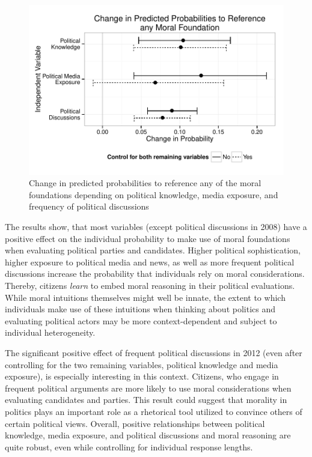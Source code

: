 \documentclass[12pt]{article}
\begin{document}
\begin{figure}\centering
\includegraphics{../calc/fig/fig3learn.pdf}
\caption{Change in predicted probabilities to reference any of the moral foundations depending on political knowledge, media exposure, and frequency of political discussions}\label{fig:3learn}
\end{figure}

The results show, that most variables (except political discussions in 2008) have a positive effect on the individual probability to make use of moral foundations when evaluating political parties and candidates. Higher political sophistication, higher exposure to political media and news, as well as more frequent political discussions increase the probability that individuals rely on moral considerations. Thereby, citizens \textit{learn} to embed moral reasoning in their political evaluations. While moral intuitions themselves might well be innate, the extent to which individuals make use of these intuitions when thinking about politics and evaluating political actors may be more context-dependent and subject to individual heterogeneity.

The significant positive effect of frequent political discussions in 2012 (even after controlling for the two remaining variables, political knowledge and media exposure), is especially interesting in this context. Citizens, who engage in frequent political arguments are more likely to use moral considerations when evaluating candidates and parties. This result could suggest that morality in politics plays an important role as a rhetorical tool utilized to convince others of certain political views. Overall, positive relationships between political knowledge, media exposure, and political discussions and moral reasoning are quite robust, even while controlling for individual response lengths.
\end{document}

